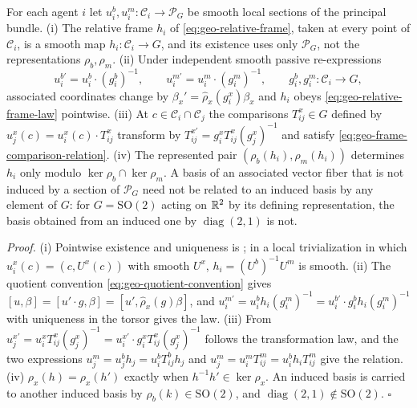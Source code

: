 For each agent \(i\) let \(u_i^b,u_i^m:\mathcal C_i\to\mathscr P_G\) be smooth local sections of the
principal bundle. (i) The relative frame \(h_i\) of \eqref{eq:geo-relative-frame}, taken at every
point of \(\mathcal C_i\), is a smooth map \(h_i:\mathcal C_i\to G\), and its existence uses only
\(\mathscr P_G\), not the representations \(\rho_b,\rho_m\). (ii) Under independent smooth passive
re-expressions
\begin{equation}
u_i^{b\prime}=u_i^b\cdot(g_i^b)^{-1},
\qquad
u_i^{m\prime}=u_i^m\cdot(g_i^m)^{-1},
\qquad
g_i^b,g_i^m:\mathcal C_i\longrightarrow G,
\label{eq:geo-two-atlas-reframing}
\end{equation}
associated coordinates change by \(\beta_x'=\widehat\rho_x(g_i^x)\beta_x\) and \(h_i\) obeys
\eqref{eq:geo-relative-frame-law} pointwise. (iii) At \(c\in\mathcal C_i\cap\mathcal C_j\) the
comparisons \(T_{ij}^x\in G\) defined by \(u_j^x(c)=u_i^x(c)\cdot T_{ij}^x\) transform by
\(T_{ij}^{x\prime}=g_i^xT_{ij}^x(g_j^x)^{-1}\) and satisfy \eqref{eq:geo-frame-comparison-relation}.
(iv) The represented pair \((\rho_b(h_i),\rho_m(h_i))\) determines \(h_i\) only modulo
\(\ker\rho_b\cap\ker\rho_m\). A basis of an associated vector fiber that is not induced by a
section of \(\mathscr P_G\) need not be related to an induced basis by any element of \(G\): for
\(G=\mathrm{SO}(2)\) acting on \(\mathbb R^2\) by its defining representation, the basis obtained from an
induced one by \(\operatorname{diag}(2,1)\) is not.

\noindent\emph{Proof.}
(i) Pointwise existence and uniqueness is ; in a local
trivialization in which \(u_i^x(c)=(c,U^x(c))\) with smooth \(U^x\), \(h_i=(U^b)^{-1}U^m\) is smooth.
(ii) The quotient convention \eqref{eq:geo-quotient-convention} gives
\([u,\beta]=[u'\cdot g,\beta]=[u',\widehat\rho_x(g)\beta]\), and
\(u_i^{m\prime}=u_i^bh_i(g_i^m)^{-1}=u_i^{b\prime}\cdot g_i^bh_i(g_i^m)^{-1}\) with uniqueness in
the torsor gives the law. (iii) From
\(u_j^{x\prime}=u_i^xT_{ij}^x(g_j^x)^{-1}=u_i^{x\prime}\cdot g_i^xT_{ij}^x(g_j^x)^{-1}\) follows the
transformation law, and the two expressions \(u_j^m=u_j^bh_j=u_i^bT_{ij}^bh_j\) and
\(u_j^m=u_i^mT_{ij}^m=u_i^bh_iT_{ij}^m\) give the relation. (iv)
\(\rho_x(h)=\rho_x(h')\) exactly when \(h^{-1}h'\in\ker\rho_x\). An induced basis is carried to
another induced basis by \(\rho_b(k)\in\mathrm{SO}(2)\), and \(\operatorname{diag}(2,1)\notin
\mathrm{SO}(2)\). \hfill$\square$

